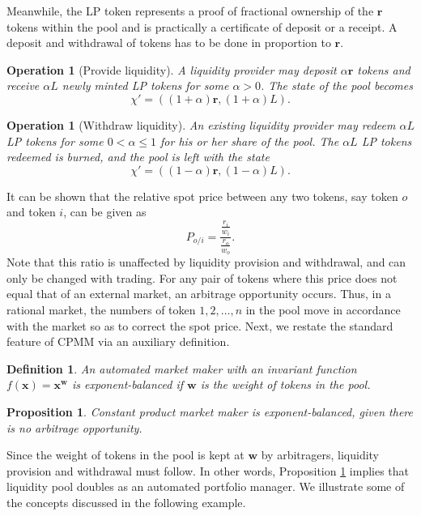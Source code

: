 \documentclass[12pt,a4paper]{article}
\newtheorem{definition}[corollary]{Definition}
\newtheorem{operation}[corollary]{Operation}
\newtheorem{proposition}[corollary]{Proposition}
\begin{document}
Meanwhile, the LP token represents a proof of fractional ownership of the $\mathbf{r}$ tokens within the pool and is practically a certificate of deposit or a receipt. A deposit and withdrawal of tokens has to be done in proportion to $\mathbf{r}$.

\begin{operation}[Provide liquidity]
A liquidity provider may deposit $\alpha\mathbf{r}$ tokens and receive $\alpha L$ newly minted LP tokens for some $\alpha>0$. The state of the pool becomes
\[\chi'=((1+\alpha)\mathbf{r},(1+\alpha)L).\]
\end{operation}

\begin{operation}[Withdraw liquidity]
An existing liquidity provider may redeem $\alpha L$ LP tokens for some $0<\alpha\leq1$ for his or her share of the pool. The $\alpha L$ LP tokens redeemed is burned, and the pool is left with the state
\[\chi'=((1-\alpha)\mathbf{r},(1-\alpha)L).\]
\end{operation}

It can be shown \cite{MM} that the relative spot price between any two tokens, say token $o$ and token $i$, can be given as
\begin{equation}\label{e:price}
P_{o/i}=\frac{\frac{r_i}{w_i}}{\frac{r_o}{w_o}}.
\end{equation}
Note that this ratio is unaffected by liquidity provision and withdrawal, and can only be changed with trading. For any pair of tokens where this price does not equal that of an external market, an arbitrage opportunity occurs. Thus, in a rational market, the numbers of token $1,2,\ldots,n$ in the pool move in accordance with the market so as to correct the spot price. Next, we restate the standard feature of CPMM via an auxiliary definition.

\begin{definition}
An automated market maker with an invariant function $f(\mathbf{x})=\mathbf{x}^\mathbf{w}$ is \emph{exponent-balanced} if $\mathbf{w}$ is the weight of tokens in the pool.
\end{definition}

\begin{proposition}\cite{MM}\label{p:eb1}
Constant product market maker is exponent-balanced, given there is no arbitrage opportunity.
\end{proposition}

Since the weight of tokens in the pool is kept at $\mathbf{w}$ by arbitragers, liquidity provision and withdrawal must follow. In other words, Proposition \ref{p:eb1} implies that liquidity pool doubles as an automated portfolio manager. We illustrate some of the concepts discussed in the following example.
\end{document}
